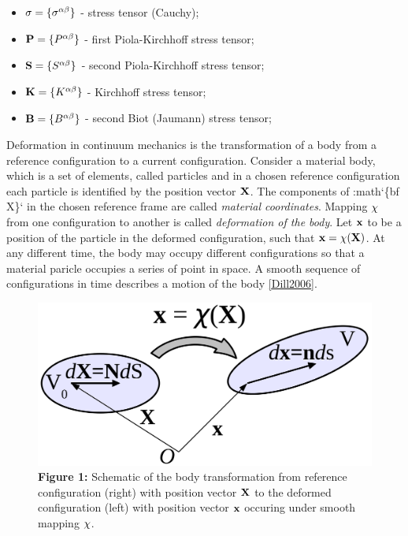 \documentclass[letterpaper,10pt,english]{sphinxmanual}
\begin{document}
\begin{itemize}
\item {} 
${\bf \sigma}=\{\sigma^{\alpha\beta}\}$ - stress tensor (Cauchy);

\item {} 
${\bf P}=\{P^{\alpha\beta}\}$ - first Piola-Kirchhoff stress tensor;

\item {} 
${\bf S}=\{S^{\alpha\beta}\}$ - second Piola-Kirchhoff stress tensor;

\item {} 
${\bf K}=\{K^{\alpha\beta}\}$ - Kirchhoff stress tensor;

\item {} 
${\bf B}=\{B^{\alpha\beta}\}$ - second Biot (Jaumann) stress tensor;

\end{itemize}

Deformation in continuum mechanics is the transformation of a body from a reference configuration to a current configuration. Consider a material body, which is a set of elements, called particles and in a chosen reference configuration each particle is identified by the position vector ${\bf X}$. The components of :math{}`\{bf X\}{}` in the chosen reference frame are called \emph{material coordinates}. Mapping ${\bf \chi}$ from one configuration to another is called \emph{deformation of the body}. Let ${\bf x}$ to be a position of the particle in the deformed configuration, such that ${\bf x}={\bf \chi}({\bf X})$. At any different time, the body may occupy different configurations so that a material paricle occupies a series of point in space. A smooth sequence of configurations in time describes a motion of the body {\hyperref[general:dill2006]{{[}Dill2006{]}}}.
\begin{figure}[htbp]
\centering
\capstart

\includegraphics{Fig1.png}
\caption{\textbf{Figure 1:} Schematic of the body transformation from reference configuration (right) with position vector ${\bf X}$ to the deformed configuration (left) with position vector ${\bf x}$ occuring under smooth mapping ${\bf \chi}$.}\end{figure}
\end{document}
